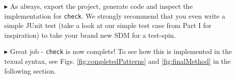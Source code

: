 \begin{itemize}
\item[$\blacktriangleright$] As always, export the project, generate code and inspect the implementation for \texttt{check}.  We strongly recommend that you
even write a simple JUnit test (take a look at our simple test case from Part I for inspiration) to take your brand new SDM for a test-spin.


\item[$\blacktriangleright$] Great job - \texttt{check} is now complete! To see how this is implemented in the texual syntax, see Figs.
\ref{fig:completedPatterns} and \ref{fig:finalMethod} in the following section.


\end{itemize}
